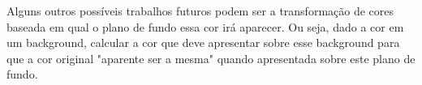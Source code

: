 \par
Alguns outros possíveis trabalhos futuros podem ser a transformação de cores
baseada em qual o plano de fundo essa cor irá aparecer. Ou seja, dado a cor em
um background, calcular a cor que deve apresentar sobre esse background
para que a cor original "aparente ser a mesma" quando apresentada sobre este
plano de fundo.

